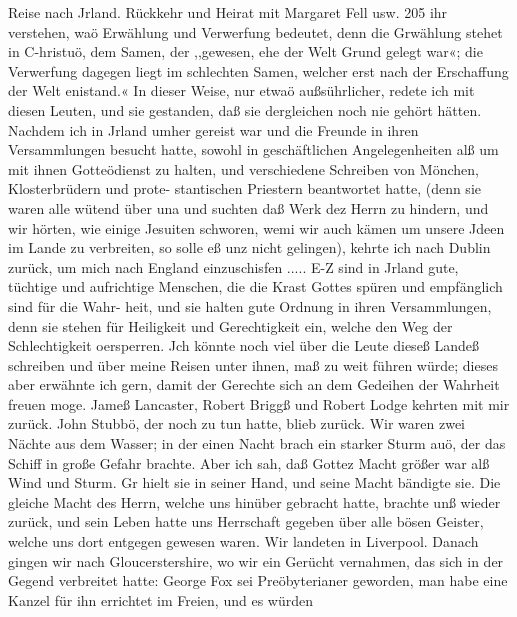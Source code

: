 Reise nach Jrland. Rückkehr und Heirat mit Margaret Fell usw. 205
ihr verstehen, waö Erwählung und Verwerfung bedeutet, denn
die Grwählung stehet in C-hristuö, dem Samen, der ,,gewesen,
ehe der Welt Grund gelegt war«; die Verwerfung dagegen liegt
im schlechten Samen, welcher erst nach der Erschaffung der Welt
enistand.« In dieser Weise, nur etwaö außsührlicher, redete ich
mit diesen Leuten, und sie gestanden, daß sie dergleichen noch
nie gehört hätten.
Nachdem ich in Jrland umher gereist war und die Freunde
in ihren Versammlungen besucht hatte, sowohl in geschäftlichen
Angelegenheiten alß um mit ihnen Gotteödienst zu halten, und
verschiedene Schreiben von Mönchen, Klosterbrüdern und prote-
stantischen Priestern beantwortet hatte, (denn sie waren alle
wütend über una und suchten daß Werk dez Herrn zu hindern,
und wir hörten, wie einige Jesuiten schworen, wemi wir auch
kämen um unsere Jdeen im Lande zu verbreiten, so solle eß unz
nicht gelingen), kehrte ich nach Dublin zurück, um mich nach England
einzuschisfen .....
E-Z sind in Jrland gute, tüchtige und aufrichtige Menschen,
die die Krast Gottes spüren und empfänglich sind für die Wahr-
heit, und sie halten gute Ordnung in ihren Versammlungen,
denn sie stehen für Heiligkeit und Gerechtigkeit ein, welche den
Weg der Schlechtigkeit oersperren. Jch könnte noch viel über
die Leute dieseß Landeß schreiben und über meine Reisen unter
ihnen, maß zu weit führen würde; dieses aber erwähnte ich gern,
damit der Gerechte sich an dem Gedeihen der Wahrheit freuen
moge.
Jameß Lancaster, Robert Briggß und Robert Lodge kehrten
mit mir zurück. John Stubbö, der noch zu tun hatte, blieb zurück.
Wir waren zwei Nächte aus dem Wasser; in der einen Nacht
brach ein starker Sturm auö, der das Schiff in große Gefahr
brachte. Aber ich sah, daß Gottez Macht größer war alß Wind
und Sturm. Gr hielt sie in seiner Hand, und seine Macht bändigte
sie. Die gleiche Macht des Herrn, welche uns hinüber gebracht
hatte, brachte unß wieder zurück, und sein Leben hatte uns Herrschaft
gegeben über alle bösen Geister, welche uns dort entgegen gewesen
waren. Wir landeten in Liverpool. Danach gingen wir nach
Gloucerstershire, wo wir ein Gerücht vernahmen, das sich in der
Gegend verbreitet hatte: George Fox sei Preöbyterianer geworden,
man habe eine Kanzel für ihn errichtet im Freien, und es würden


